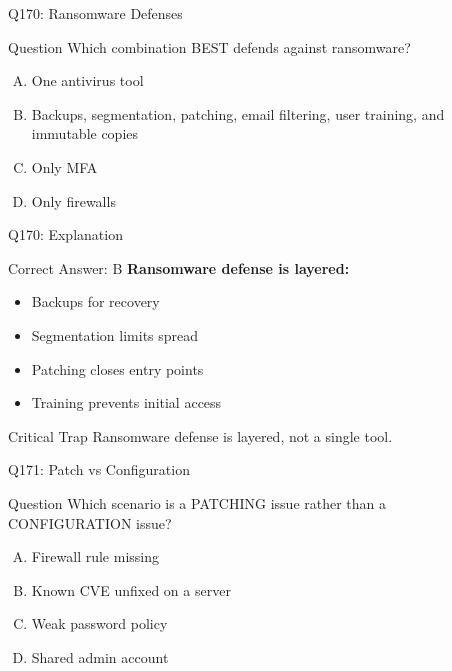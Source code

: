 \documentclass{beamer}
\begin{document}
	\begin{frame}{Q170: Ransomware Defenses}
		\begin{block}{Question}
			Which combination BEST defends against ransomware?
		\end{block}
		\begin{enumerate}[(A)]
			\item One antivirus tool
			\item Backups, segmentation, patching, email filtering, user training, and immutable copies
			\item Only MFA
			\item Only firewalls
		\end{enumerate}
	\end{frame}
	
	\begin{frame}{Q170: Explanation}
		\begin{block}{Correct Answer: B}
			\textbf{Ransomware defense is layered:}
			\begin{itemize}
				\item Backups for recovery
				\item Segmentation limits spread
				\item Patching closes entry points
				\item Training prevents initial access
			\end{itemize}
		\end{block}
		\begin{alertblock}{Critical Trap}
			Ransomware defense is layered, not a single tool.
		\end{alertblock}
	\end{frame}
	
	\begin{frame}{Q171: Patch vs Configuration}
		\begin{block}{Question}
			Which scenario is a PATCHING issue rather than a CONFIGURATION issue?
		\end{block}
		\begin{enumerate}[(A)]
			\item Firewall rule missing
			\item Known CVE unfixed on a server
			\item Weak password policy
			\item Shared admin account
		\end{enumerate}
	\end{frame}
	
\end{document}
